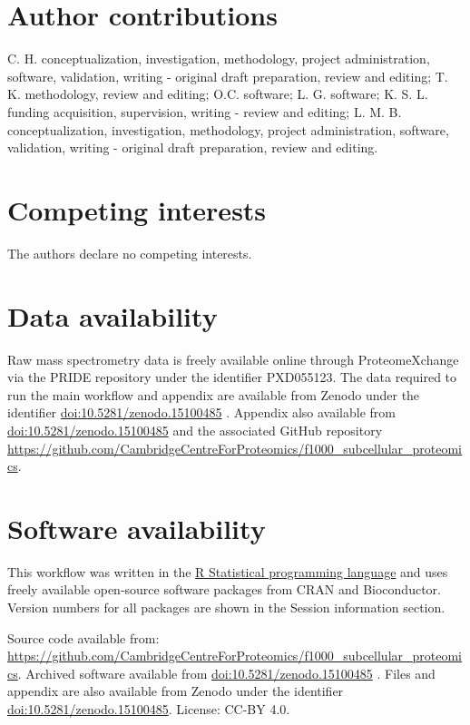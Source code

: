 \documentclass[9pt,a4paper,]{extarticle}
\begin{document}
\section{Author contributions}\label{author-contributions}

C. H. conceptualization, investigation, methodology, project administration,
software, validation, writing - original draft preparation, review and editing;
T. K. methodology, review and editing; O.C. software; L. G. software; K. S. L.
funding acquisition, supervision, writing - review and editing; L. M. B.
conceptualization, investigation, methodology, project administration, software,
validation, writing - original draft preparation, review and editing.

\section{Competing interests}\label{competing-interests}

The authors declare no competing interests.

\section{Data availability}\label{data-availability}

Raw mass spectrometry data is freely available online through ProteomeXchange
via the PRIDE repository under the identifier PXD055123. The data required to run
the main workflow and appendix are available from Zenodo under the
identifier \href{http://doi.org/10.5281/zenodo.15100485}{doi:10.5281/zenodo.15100485} \citep{dataref}.
Appendix also available from \href{http://doi.org/10.5281/zenodo.15100485}{doi:10.5281/zenodo.15100485} \citep{dataref}
and the associated GitHub repository \url{https://github.com/CambridgeCentreForProteomics/f1000_subcellular_proteomics}.

\section{Software availability}\label{software-availability}

This workflow was written in the \href{https://www.r-project.org}{R Statistical programming language} and uses
freely available open-source software packages from CRAN and Bioconductor.
Version numbers for all packages are shown in the Session information section.

Source code available from: \url{https://github.com/CambridgeCentreForProteomics/f1000_subcellular_proteomics}. Archived
software available from \href{http://doi.org/10.5281/zenodo.15100485}{doi:10.5281/zenodo.15100485} \citep{dataref}.
Files and appendix are also available from Zenodo under the identifier
\href{http://doi.org/10.5281/zenodo.15100485}{doi:10.5281/zenodo.15100485}.
License: CC-BY 4.0.
\end{document}
